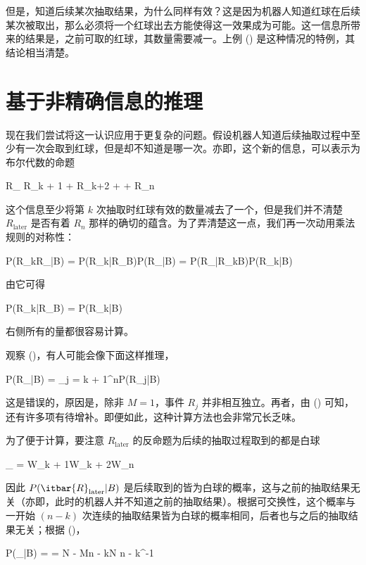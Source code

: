 但是，知道后续某次抽取结果，为什么同样有效？这是因为机器人知道红球在后续某次被取出，那么必须将一个红球出去方能使得这一效果成为可能。这一信息所带来的结果是，之前可取的红球，其数量需要减一。上例 (\in[3-38]) 是这种情况的特例，其结论相当清楚。

\section{基于非精确信息的推理}

现在我们尝试将这一认识应用于更复杂的问题。假设机器人知道后续抽取过程中至少有一次会取到红球，但是却不知道是哪一次。亦即，这个新的信息，可以表示为布尔代数的命题

\placeformula[3-49]
\startformula
R_{} \equiv R_{k + 1} + R_{k+2} + \cdots + R_n
\stopformula

这个信息至少将第 $k$ 次抽取时红球有效的数量减去了一个，但是我们并不清楚 $R_{\text{later}}$ 是否有着 $R_n$ 那样的确切的蕴含。为了弄清楚这一点，我们再一次动用乘法规则的对称性：

\placeformula[3-50]
\startformula
P(R_kR_{}|B) = P(R_k|R_{}B)P(R_{}|B) = P(R_{}|R_kB)P(R_k|B)
\stopformula

由它可得

\placeformula[3-51]
\startformula
P(R_k|R_{}B) = P(R_k|B)
\stopformula

右侧所有的量都很容易计算。

观察 (\in[3-49])，有人可能会像下面这样推理，


\placeformula[3-52]
\startformula
P(R_{}|B) = \sum_{j = k + 1}^nP(R_j|B)
\stopformula

这是错误的，原因是，除非 $M = 1$，事件 $R_j$ 并非相互独立。再者，由 (\in[2-82]) 可知，还有许多项有待增补。即便如此，这种计算方法也会非常冗长乏味。

为了便于计算，要注意 $R_{\text{later}}$ 的反命题为后续的抽取过程取到的都是白球

\placeformula[3-53]
\startformula
{}_{} = W_{k + 1}W_{k + 2}\cdots W_n
\stopformula

因此 $P(\itbar{R}_{\text{later}}|B)$ 是后续取到的皆为白球的概率，这与之前的抽取结果无关（亦即，此时的机器人并不知道之前的抽取结果）。根据可交换性，这个概率与一开始 $(n - k)$ 次连续的抽取结果皆为白球的概率相同，后者也与之后的抽取结果无关；根据 (\in[3-13])，

\placeformula[3-54]
\startformula
P(_{}|B) =  = \startpmatrix N - M\NR n - k\NR\stoppmatrix\startpmatrix N \NR n - k\NR\stoppmatrix^{-1}
\stopformula

